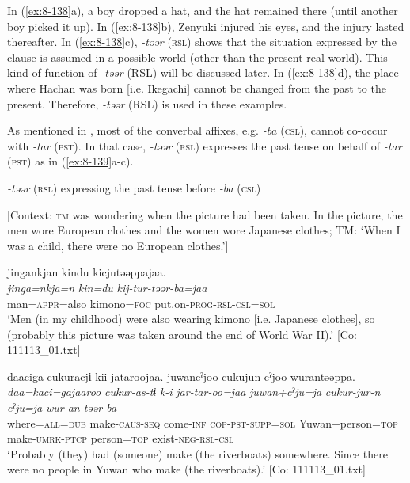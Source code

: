 In (\ref{ex:8-138}a), a boy dropped a hat, and the hat remained there (until another boy picked it up). In (\ref{ex:8-138}b), Zenyuki injured his eyes, and the injury lasted thereafter. In (\ref{ex:8-138}c), \textit{-təər} (\textsc{rsl}) shows that the situation expressed by the clause is assumed in a possible world (other than the present real world). This kind of function of \textit{-təər} (RSL) will be discussed later. In (\ref{ex:8-138}d), the place where Hachan was born [i.e. Ikegachi] cannot be changed from the past to the present. Therefore, \textit{-təər} (RSL) is used in these examples.

  As mentioned in , most of the converbal affixes, e.g. \textit{-ba} (\textsc{csl}), cannot co-occur with \textit{-tar} (\textsc{pst}). In that case, \textit{-təər} (\textsc{rsl}) expresses the past tense on behalf of \textit{-tar} (\textsc{pst}) as in (\ref{ex:8-139}a-c).

\ea\label{ex:8-139}
  \textit{-təər} (\textsc{rsl}) expressing the past tense before \textit{-ba} (\textsc{csl})

\ea {}[Context: \textsc{tm} was wondering when the picture had been taken. In the picture, the men wore European clothes and the women wore Japanese clothes; TM: ‘When I was a child, there were no European clothes.’]

{\TM}
\glll  jingankjan  kindu  kicjutəəppajaa.\\
\textit{jinga=nkja=n}  \textit{kin=du}  \textit{kij-tur-təər-ba=jaa}\\
man=\textsc{appr}=also  kimono=\textsc{foc}  put.on-\textsc{prog}-\textsc{rsl}-\textsc{csl}=\textsc{sol}\\
\glt ‘Men (in my childhood) were also wearing kimono [i.e. Japanese clothes], so (probably this picture was taken around the end of World War II).’ [Co: 111113\_01.txt]

\ex
{\TM}
\glll  daaciga{\footnotemark} cukuracjɨ  kii  jataroojaa.      juwancˀjoo  cukujun  cˀjoo  wurantəəppa.\\
\textit{daa=kaci=gajaaroo}  \textit{cukur-as-tɨ}  \textit{k-i}  \textit{jar-tar-oo=jaa}      \textit{juwan+cˀju=ja}  \textit{cukur-jur-n}  \textit{cˀju=ja}  \textit{wur-an-təər-ba}\\
where=\textsc{all}=\textsc{dub}  make-\textsc{caus}-\textsc{seq}  come-\textsc{inf}  \textsc{cop}-\textsc{pst}-\textsc{supp}=\textsc{sol}   Yuwan+person=\textsc{top}  make-\textsc{umrk}-\textsc{ptcp}  person=\textsc{top}  exist-\textsc{neg}-\textsc{rsl}-\textsc{csl}\\
\glt ‘Probably (they) had (someone) make (the riverboats) somewhere. Since there were no people in Yuwan who make (the riverboats).’ [Co: 111113\_01.txt]


